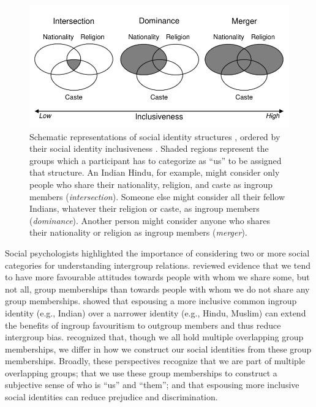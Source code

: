 \documentclass[12pt, a4paper]{article}
\begin{document}
\begin{figure}
\centering
\includegraphics[scale=1]{../figures/figure-1}
\caption{
Schematic representations of social identity structures \protect\parencite{roccas_social_2002}, ordered by their social identity inclusiveness \protect\parencite{van_dommelen_construing_2015}. Shaded regions represent the groups which a participant has to categorize as “us” to be assigned that structure. An Indian Hindu, for example, might consider only people who share their nationality, religion, and caste as ingroup members (\emph{intersection}). Someone else might consider all their fellow Indians, whatever their religion or caste, as ingroup members (\emph{dominance}). Another person might consider anyone who shares their nationality or religion as ingroup members (\emph{merger}).
}
\label{fig:f1}
\end{figure}

Social psychologists highlighted the importance of considering two \parencite{berry_immigration_1997, crisp_multiple_2007, dovidio_commonality_2009} or more \parencite{roccas_social_2002} social categories for understanding intergroup relations. \textcite{crisp_multiple_2007} reviewed evidence that we tend to have more favourable attitudes towards people with whom we share some, but not all, group memberships than towards people with whom we do not share any group memberships. \textcite{gaertner_reducing_2000} showed that espousing a more inclusive common ingroup identity (e.g., Indian) over a narrower identity (e.g., Hindu, Muslim) can extend the benefits of ingroup favouritism to outgroup members and thus reduce intergroup bias. \textcite{roccas_social_2002} recognized that, though we all hold multiple overlapping group memberships, we differ in how we construct our social identities from these group memberships. Broadly, these perspectives recognize that we are part of multiple overlapping groups; that we use these group memberships to construct a subjective sense of who is “us” and “them”; and that espousing more inclusive social identities can reduce prejudice and discrimination.
\end{document}
